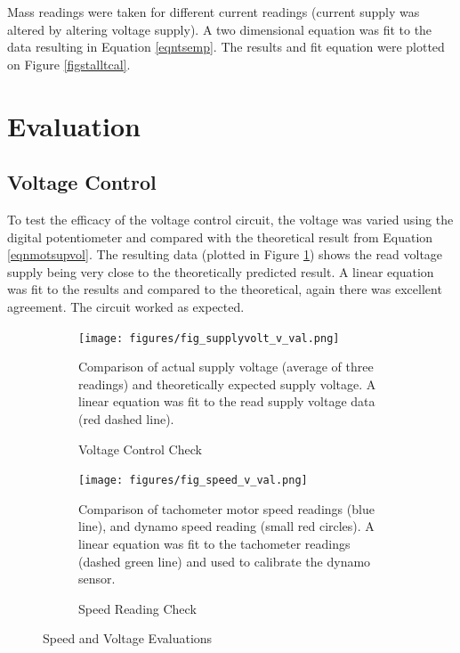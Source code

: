 \documentclass[twoside,a4]{report}
\begin{document}
	\noindent
	Mass readings were taken for different current readings (current supply was altered by altering voltage supply). A two dimensional equation was fit to the data resulting in Equation \ref{eqntsemp}. The results and fit equation were plotted on Figure \ref{figstalltcal}.

	\section{Evaluation}
	
	\subsection*{Voltage Control}
	To test the efficacy of the voltage control circuit, the voltage was varied using the digital potentiometer and compared with the theoretical result from Equation \ref{eqnmotsupvol}. The resulting data (plotted in Figure \ref{figvoltvval}) shows the read voltage supply being very close to the theoretically predicted result. A linear equation was fit to the results and compared to the theoretical, again there was excellent agreement. The circuit worked as expected.
	\begin{figure}[!htb]
		\centering
		\begin{subfigure}[t]{0.45\textwidth}
			\centering
			\texttt{[image: figures/fig\_supplyvolt\_v\_val.png]}
			\caption{Voltage Control Check}
			\label{figvoltvval}
			\footnotesize
			Comparison of actual supply voltage (average of three readings) and theoretically expected supply voltage. A linear equation was fit to the read supply voltage data (red dashed line).
		\end{subfigure}
		\begin{subfigure}[t]{0.45\textwidth}
			\centering
			\texttt{[image: figures/fig\_speed\_v\_val.png]}
			\caption{Speed Reading Check}
			\label{figdynocheck}
			\footnotesize
			Comparison of tachometer motor speed readings (blue line), and dynamo speed reading (small red circles). A linear equation was fit to the tachometer readings (dashed green line) and used to calibrate the dynamo sensor.
		\end{subfigure}
		\label{figspeecal}
		\caption{Speed and Voltage Evaluations}
	\end{figure}
\end{document}
